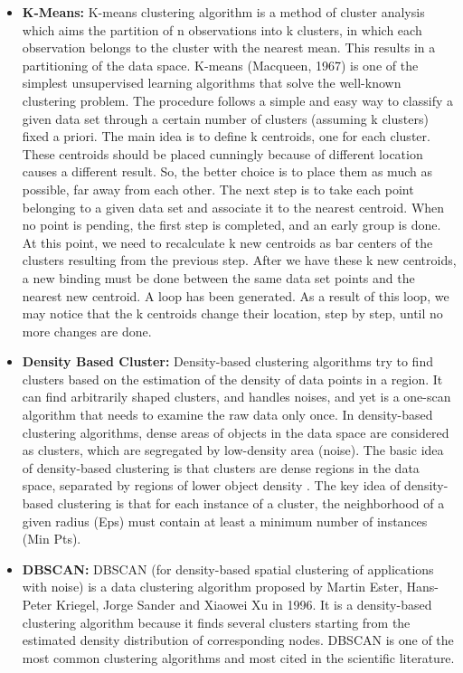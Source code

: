 \begin{itemize}
\item \textbf{K-Means:}
K-means clustering algorithm \cite{HitchcockKmeans} is a method of cluster analysis which aims the partition of n observations into k clusters, in which each observation belongs to the cluster with the nearest mean. This results in a partitioning of the data space. K-means (Macqueen, 1967) is one of the simplest unsupervised learning algorithms that solve the well-known clustering problem. The procedure follows a simple and easy way to classify a given data set through a certain number of clusters (assuming k clusters) fixed a priori. The main idea is to define k centroids, one for each cluster. These centroids should be placed cunningly because of different location causes a different result. So, the better choice is to place them as much as possible, far away from each other. The next step is to take each point belonging to a given data set and associate it to the nearest centroid. When no point is pending, the first step is completed, and an early group is done. At this point, we need to recalculate k new centroids as bar centers of the clusters resulting from the previous step. After we have these k new centroids, a new binding must be done between the same data set points and the nearest new centroid. A loop has been generated. As a result of this loop, we may notice that the k centroids change their location, step by step, until no more changes are done.

\item \textbf{Density Based Cluster:}
Density-based clustering algorithms \cite{WekaCC} try to find clusters based on the estimation of the density of data points in a region.
It can find arbitrarily shaped clusters, and handles noises, and yet is a one-scan algorithm that needs to examine the raw data only once. In density-based clustering algorithms, dense areas of objects in the data space are considered as clusters, which are segregated by low-density area (noise). The basic idea of density-based clustering is that clusters are dense regions in the data space, separated by regions of lower object density \cite{WEKATalankiDensity}.
The key idea of density-based clustering is that for each instance of a cluster, the neighborhood of a given radius (Eps) must contain at least a minimum number of instances (Min Pts).

\item \textbf{DBSCAN:}
DBSCAN (for density-based spatial clustering of applications with noise) is a data clustering algorithm proposed by Martin Ester, Hans-Peter Kriegel, Jorge Sander and Xiaowei Xu in 1996. It is a density-based clustering algorithm because it finds several clusters starting from the estimated density distribution of corresponding nodes. DBSCAN \cite{Kisilevich2010PDBSCANAD} is one of the most common clustering algorithms and most cited in the scientific literature.
\end{itemize}

